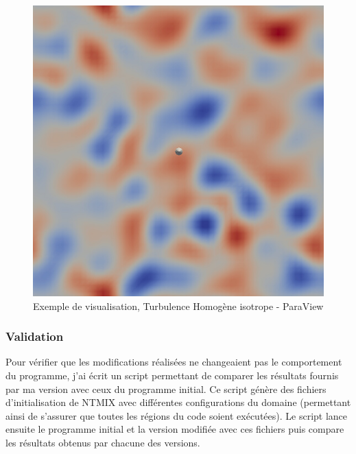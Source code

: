 \begin{figure}[h!]
  \centering
  \includegraphics[scale=0.3]{figures/thi-example.png}
  \caption{\label{fig:visu}Exemple de visualisation, Turbulence Homogène isotrope - ParaView}
\end{figure}



\subsubsection{Validation}
Pour vérifier que les modifications réalisées ne changeaient pas le comportement du programme, j'ai écrit un script permettant de comparer les résultats fournis par ma version avec ceux du programme initial. Ce script génère des fichiers d'initialisation de NTMIX avec différentes configurations du domaine (permettant ainsi de s'assurer que toutes les régions du code soient exécutées). Le script lance ensuite le programme initial et la version modifiée avec ces fichiers puis compare les résultats obtenus par chacune des versions.


